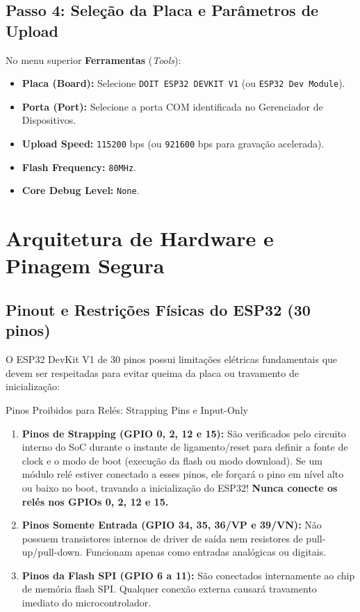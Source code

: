 \documentclass[a4paper,11pt]{article}
\begin{document}
\subsection{Passo 4: Seleção da Placa e Parâmetros de Upload}
No menu superior \textbf{Ferramentas} (\textit{Tools}):
\begin{itemize}
    \item \textbf{Placa (Board):} Selecione \texttt{DOIT ESP32 DEVKIT V1} (ou \texttt{ESP32 Dev Module}).
    \item \textbf{Porta (Port):} Selecione a porta COM identificada no Gerenciador de Dispositivos.
    \item \textbf{Upload Speed:} \texttt{115200} bps (ou \texttt{921600} bps para gravação acelerada).
    \item \textbf{Flash Frequency:} \texttt{80MHz}.
    \item \textbf{Core Debug Level:} \texttt{None}.
\end{itemize}

\section{Arquitetura de Hardware e Pinagem Segura}

\subsection{Pinout e Restrições Físicas do ESP32 (30 pinos)}
O ESP32 DevKit V1 de 30 pinos possui limitações elétricas fundamentais que devem ser respeitadas para evitar queima da placa ou travamento de inicialização:

\begin{warnbox}{Pinos Proibidos para Relés: Strapping Pins e Input-Only}
\begin{enumerate}[leftmargin=*]
    \item \textbf{Pinos de Strapping (GPIO 0, 2, 12 e 15):} São verificados pelo circuito interno do SoC durante o instante de ligamento/reset para definir a fonte de clock e o modo de boot (execução da flash ou modo download). Se um módulo relé estiver conectado a esses pinos, ele forçará o pino em nível alto ou baixo no boot, travando a inicialização do ESP32! \textbf{Nunca conecte os relés nos GPIOs 0, 2, 12 e 15.}
    \item \textbf{Pinos Somente Entrada (GPIO 34, 35, 36/VP e 39/VN):} Não possuem transistores internos de driver de saída nem resistores de pull-up/pull-down. Funcionam apenas como entradas analógicas ou digitais.
    \item \textbf{Pinos da Flash SPI (GPIO 6 a 11):} São conectados internamente ao chip de memória flash SPI. Qualquer conexão externa causará travamento imediato do microcontrolador.
\end{enumerate}
\end{warnbox}
\end{document}
